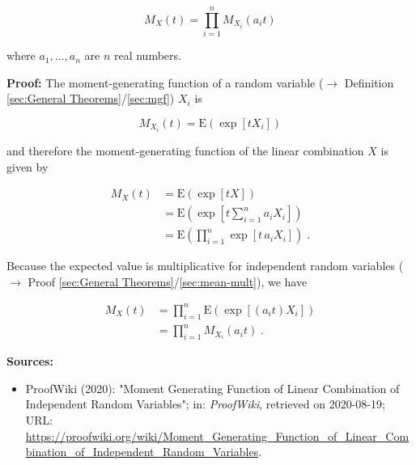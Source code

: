 \documentclass[a4paper,12pt,twoside]{book}
\begin{document}
\begin{equation} \label{eq:mgf-lincomb-mgf-lincomb}
M_X(t) = \prod_{i=1}^{n} M_{X_i}(a_i t)
\end{equation}

where $a_1, \ldots, a_n$ are $n$ real numbers.


\vspace{1em}
\textbf{Proof:} The moment-generating function of a random variable ($\rightarrow$ Definition \ref{sec:General Theorems}/\ref{sec:mgf}) $X_i$ is

\begin{equation} \label{eq:mgf-lincomb-mfg-vect}
M_{X_i}(t) = \mathrm{E} \left( \exp \left[ t X_i \right] \right)
\end{equation}

and therefore the moment-generating function of the linear combination $X$ is given by

\begin{equation} \label{eq:mgf-lincomb-mgf-lincomb-s1}
\begin{split}
M_X(t) &= \mathrm{E} \left( \exp \left[ t X \right] \right) \\
&= \mathrm{E} \left( \exp \left[ t \sum_{i=1}^{n} a_i X_i \right] \right) \\
&= \mathrm{E} \left( \prod_{i=1}^{n} \exp \left[ t \, a_i X_i \right] \right) \; .
\end{split}
\end{equation}

Because the expected value is multiplicative for independent random variables ($\rightarrow$ Proof \ref{sec:General Theorems}/\ref{sec:mean-mult}), we have

\begin{equation} \label{eq:mgf-lincomb-mgf-lincomb-s2}
\begin{split}
M_X(t) &= \prod_{i=1}^{n} \mathrm{E} \left( \exp \left[ (a_i t) X_i \right] \right) \\
&= \prod_{i=1}^{n} M_{X_i}(a_i t) \; .
\end{split}
\end{equation}


\vspace{1em}
\textbf{Sources:}
\begin{itemize}
\item ProofWiki (2020): "Moment Generating Function of Linear Combination of Independent Random Variables"; in: \textit{ProofWiki}, retrieved on 2020-08-19; URL: \url{https://proofwiki.org/wiki/Moment_Generating_Function_of_Linear_Combination_of_Independent_Random_Variables}.
\end{itemize}
\end{document}
